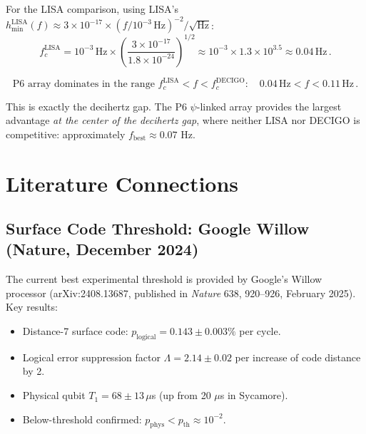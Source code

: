 \documentclass[11pt]{article}
\theoremstyle{definition}
\theoremstyle{remark}
\begin{document}
For the LISA comparison, using LISA's $h_{\min}^{\mathrm{LISA}}(f) \approx
3\times 10^{-17} \times (f/10^{-3}\,\mathrm{Hz})^{-2}/\sqrt{\mathrm{Hz}}$:
\begin{equation}
f_c^{\mathrm{LISA}} = 10^{-3}\,\mathrm{Hz} \times
\left(\frac{3\times 10^{-17}}{1.8\times 10^{-24}}\right)^{1/2}
\approx 10^{-3} \times 1.3\times 10^{3.5} \approx 0.04\,\mathrm{Hz}\,.
\end{equation}

\begin{equation}
\boxed{
\text{P6 array dominates in the range } f_c^{\mathrm{LISA}} < f
< f_c^{\mathrm{DECIGO}}: \quad 0.04\,\mathrm{Hz} < f < 0.11\,\mathrm{Hz}\,.
}
\label{eq:advantage-band}
\end{equation}

This is exactly the decihertz gap. The P6 $\psi$-linked array provides the
largest advantage \emph{at the center of the decihertz gap}, where neither
LISA nor DECIGO is competitive: approximately $f_{\mathrm{best}} \approx 0.07$
Hz.

\section{Literature Connections}
\label{sec:literature}

\subsection{Surface Code Threshold: Google Willow (Nature, December 2024)}

The current best experimental threshold is provided by Google's Willow
processor (arXiv:2408.13687, published in \textit{Nature} 638, 920--926,
February 2025). Key results:

\begin{itemize}
\item Distance-7 surface code: $p_{\mathrm{logical}} = 0.143 \pm 0.003\%$
per cycle.
\item Logical error suppression factor $\Lambda = 2.14 \pm 0.02$ per increase
of code distance by 2.
\item Physical qubit $T_1 = 68 \pm 13\,\mu$s (up from 20 $\mu$s in Sycamore).
\item Below-threshold confirmed: $p_{\mathrm{phys}} < p_{\mathrm{th}} \approx
10^{-2}$.
\end{itemize}
\end{document}
